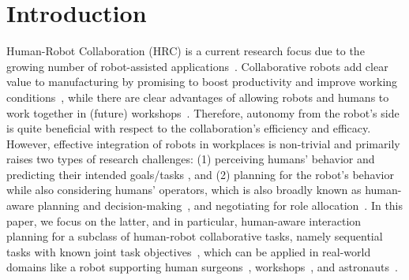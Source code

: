 \documentclass[letterpaper]{article} %
\begin{document}
\section{Introduction}
Human-Robot Collaboration (HRC) is a current research focus due to the growing number of robot-assisted applications~\cite{kragic2021effective,selvaggio2021autonomy}. Collaborative robots add clear value to manufacturing by promising to boost productivity and improve working conditions~\cite{johannsmeier2016hierarchical}, while there are clear advantages of allowing robots and humans to work together in (future) workshops~\cite{hoffman2007effects,coupete2015gesture}.
Therefore, autonomy from the robot's side is quite beneficial with respect to the collaboration's efficiency and efficacy.  
However, effective integration of robots in workplaces is non-trivial and primarily raises two types of research challenges: (1) perceiving humans' behavior and predicting their intended goals/tasks \cite{cheng2020towards,cheng2019human}, and (2) planning for the robot's behavior while also considering humans' operators, which is also broadly known as human-aware planning and decision-making~\cite{CirilloKS09,alami2006toward,de2015hatp,CramerKD21,UnhelkarLS20}, and negotiating for role allocation~\cite{roncone2017transparent}. 
In this paper, we focus on the latter, and in particular, human-aware interaction planning for a subclass of human-robot collaborative tasks, namely sequential tasks with known joint task objectives~\cite{cheng2021human,UnhelkarLS19,buisan:hal-03684211}, which can be applied in real-world domains like a robot supporting human surgeons~\cite{jacob2013collaboration}, workshops~\cite{unhelkar2018human}, and astronauts~\cite{diftler2011robonaut}. 
\end{document}
